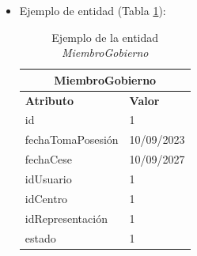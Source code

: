 \begin{itemize}
    \item Ejemplo de entidad (Tabla \ref{table:T-MiembroGobierno}):

    \begin{table}[H]
    \centering
        \begin{tabular}{ |p{6cm}||p{6cm}|  }
             \hline
                \multicolumn{2}{|c|}{\textbf{MiembroGobierno}} \\
             \hline
                 \textbf{Atributo} & \textbf{Valor} \\
             \hline
                 id & 1 \\
             \hline
                 fechaTomaPosesión & 10/09/2023 \\
             \hline
                 fechaCese & 10/09/2027 \\
             \hline
                 idUsuario & 1 \\
             \hline
                 idCentro & 1 \\
            \hline
                 idRepresentación & 1 \\
             \hline
                 estado & 1 \\
        \end{tabular}
        \caption{Ejemplo de la entidad \textit{MiembroGobierno}}
        \label{table:T-MiembroGobierno}
    \end{table}
\end{itemize}

